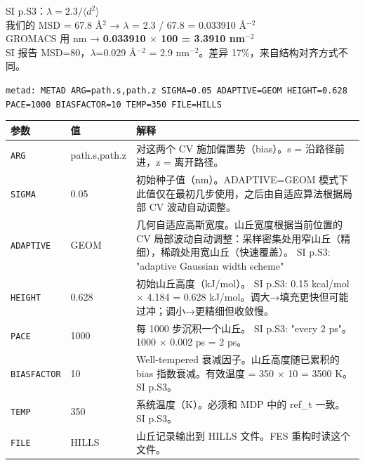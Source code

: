 \documentclass[11pt,a4paper]{article}
\begin{document}
\begin{srcbox}[LAMBDA=3.3910 的来源]
SI p.S3：$\lambda = 2.3 / \langle d^2 \rangle$\\
我们的 MSD = 67.8 \AA$^2$ → $\lambda$ = 2.3 / 67.8 = 0.033910 \AA$^{-2}$\\
GROMACS 用 nm → \textbf{0.033910 $\times$ 100 = 3.3910 nm$^{-2}$}\\
\textcolor{sourcecolor}{SI 报告 MSD=80，$\lambda$=0.029 \AA$^{-2}$ = 2.9 nm$^{-2}$。差异 17\%，来自结构对齐方式不同。}
\end{srcbox}

\vspace{8pt}

\noindent\texttt{\textcolor{paramcolor}{metad: METAD ARG=path.s,path.z SIGMA=0.05 ADAPTIVE=GEOM HEIGHT=0.628}}\\
\texttt{\textcolor{paramcolor}{PACE=1000 BIASFACTOR=10 TEMP=350 FILE=HILLS}}

\vspace{3pt}

\begin{tabular}{@{}p{2.8cm}p{1.5cm}p{8cm}@{}}
\toprule
\textbf{参数} & \textbf{值} & \textbf{解释} \\
\midrule
\texttt{ARG} & path.s,path.z & \textcolor{notecolor}{对这两个 CV 施加偏置势（bias）。s = 沿路径前进，z = 离开路径。} \\[3pt]
\texttt{SIGMA} & 0.05 & \textcolor{notecolor}{初始种子值（nm）。ADAPTIVE=GEOM 模式下此值仅在最初几步使用，之后由自适应算法根据局部 CV 波动自动调整。} \\[3pt]
\texttt{ADAPTIVE} & GEOM & \textcolor{notecolor}{几何自适应高斯宽度。山丘宽度根据当前位置的 CV 局部波动自动调整：采样密集处用窄山丘（精细），稀疏处用宽山丘（快速覆盖）。} \textcolor{sourcecolor}{SI p.S3: "adaptive Gaussian width scheme"} \\[3pt]
\texttt{HEIGHT} & 0.628 & \textcolor{notecolor}{初始山丘高度（kJ/mol）。} \textcolor{sourcecolor}{SI p.S3: 0.15 kcal/mol $\times$ 4.184 = 0.628 kJ/mol。调大→填充更快但可能过冲；调小→更精细但收敛慢。} \\[3pt]
\texttt{PACE} & 1000 & \textcolor{notecolor}{每 1000 步沉积一个山丘。} \textcolor{sourcecolor}{SI p.S3: "every 2 ps"。1000 $\times$ 0.002 ps = 2 ps。} \\[3pt]
\texttt{BIASFACTOR} & 10 & \textcolor{notecolor}{Well-tempered 衰减因子。山丘高度随已累积的 bias 指数衰减。有效温度 = 350 $\times$ 10 = 3500 K。} \textcolor{sourcecolor}{SI p.S3。} \\[3pt]
\texttt{TEMP} & 350 & \textcolor{notecolor}{系统温度（K）。必须和 MDP 中的 ref\_t 一致。} \textcolor{sourcecolor}{SI p.S3。} \\[3pt]
\texttt{FILE} & HILLS & \textcolor{notecolor}{山丘记录输出到 HILLS 文件。FES 重构时读这个文件。} \\
\bottomrule
\end{tabular}
\end{document}
